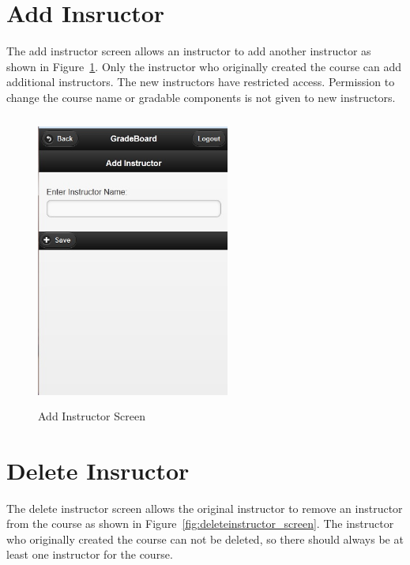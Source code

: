 \newpage
\section{Add Insructor}
The add instructor screen allows an instructor to add another instructor as shown in Figure~\ref{fig:addinstructor_screen}. Only the instructor who originally created the course can add additional instructors. The new instructors have restricted access. Permission to change the course name or gradable components is not given to new instructors.

\vspace{3em}
\begin{figure}[H]
\begin{center}
\includegraphics[height=3.8in,width=2.5in]{images/addinstructor_screen.jpg}
\caption{Add Instructor Screen}
\label{fig:addinstructor_screen}
\end{center}
\end{figure}

\newpage
\section{Delete Insructor}
The delete instructor screen allows the original instructor to remove an instructor from the course as shown in Figure~\ref{fig:deleteinstructor_screen}. The instructor who originally created the course can not be deleted, so there should always be at least one instructor for the course.

